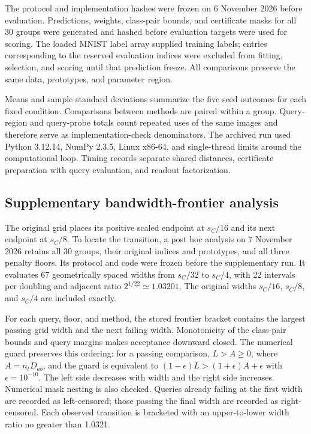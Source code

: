 \documentclass[preprint,12pt]{elsarticle}
\begin{document}
The protocol and implementation hashes were frozen on 6 November 2026 before evaluation. Predictions, weights, class-pair bounds, and certificate masks for all 30 groups were generated and hashed before evaluation targets were used for scoring. The loaded MNIST label array supplied training labels; entries corresponding to the reserved evaluation indices were excluded from fitting, selection, and scoring until that prediction freeze. All comparisons preserve the same data, prototypes, and parameter region.

Means and sample standard deviations summarize the five seed outcomes for each fixed condition. Comparisons between methods are paired within a group. Query-region and query-probe totals count repeated uses of the same images and therefore serve as implementation-check denominators. The archived run used Python 3.12.14, NumPy 2.3.5, Linux x86-64, and single-thread limits around the computational loop. Timing records separate shared distances, certificate preparation with query evaluation, and readout factorization.

\subsection{Supplementary bandwidth-frontier analysis}
The original grid places its positive scaled endpoint at $s_C/16$ and its next endpoint at $s_C/8$. To locate the transition, a post hoc analysis on 7 November 2026 retains all 30 groups, their original indices and prototypes, and all three penalty floors. Its protocol and code were frozen before the supplementary run. It evaluates 67 geometrically spaced widths from $s_C/32$ to $s_C/4$, with 22 intervals per doubling and adjacent ratio $2^{1/22}\simeq1.03201$. The original widths $s_C/16$, $s_C/8$, and $s_C/4$ are included exactly.

For each query, floor, and method, the stored frontier bracket contains the largest passing grid width and the next failing width. Monotonicity of the class-pair bounds and query margins makes acceptance downward closed. The numerical guard preserves this ordering: for a passing comparison, $L>A\geq0$, where $A=n_tD_{ab}$, and the guard is equivalent to $(1-\epsilon)L>(1+\epsilon)A+\epsilon$ with $\epsilon=10^{-10}$. The left side decreases with width and the right side increases. Numerical mask nesting is also checked. Queries already failing at the first width are recorded as left-censored; those passing the final width are recorded as right-censored. Each observed transition is bracketed with an upper-to-lower width ratio no greater than 1.0321.
\end{document}
